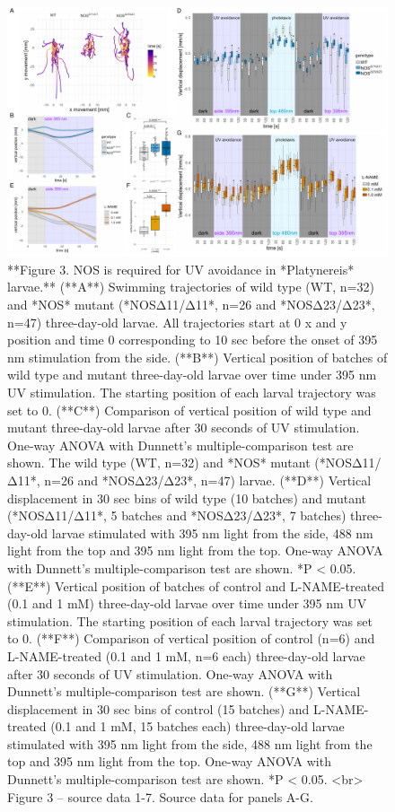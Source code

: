 \documentclass[
  10pt,
  onecolumn]{article}
\begin{document}
\begin{figure}
\includegraphics[width=44.44in]{figures/Fig3} \caption{**Figure 3. NOS is required for UV avoidance in *Platynereis* larvae.**  (**A**) Swimming trajectories of wild type (WT, n=32) and *NOS* mutant (*NOSΔ11/Δ11*, n=26 and *NOSΔ23/Δ23*, n=47) three-day-old larvae. All trajectories start at 0 x and y position and time 0 corresponding to 10 sec before the onset of 395 nm stimulation from the side. (**B**) Vertical position of batches of wild type and mutant three-day-old larvae over time under 395 nm UV stimulation. The starting position of each larval trajectory was set to 0. (**C**) Comparison of vertical position of wild type and mutant three-day-old larvae after 30 seconds of UV stimulation. One-way ANOVA with Dunnett’s multiple-comparison test are shown. The wild type (WT, n=32) and *NOS* mutant (*NOSΔ11/Δ11*, n=26 and *NOSΔ23/Δ23*, n=47) larvae. (**D**) Vertical displacement in 30 sec bins of wild type (10 batches) and mutant (*NOSΔ11/Δ11*, 5 batches and *NOSΔ23/Δ23*, 7 batches) three-day-old larvae stimulated with 395 nm light from the side, 488 nm light from the top and 395 nm light from the top. One-way ANOVA with Dunnett’s multiple-comparison test are shown. *P < 0.05. (**E**) Vertical position of batches of control and L-NAME-treated (0.1 and 1 mM) three-day-old larvae over time under 395 nm UV stimulation. The starting position of each larval trajectory was set to 0. (**F**) Comparison of vertical position of control (n=6) and L-NAME-treated (0.1 and 1 mM, n=6 each) three-day-old larvae after 30 seconds of UV stimulation. One-way ANOVA with Dunnett’s multiple-comparison test are shown. (**G**) Vertical displacement in 30 sec bins of control (15 batches) and L-NAME-treated (0.1 and 1 mM, 15 batches each) three-day-old larvae stimulated with 395 nm light from the side, 488 nm light from the top and 395 nm light from the top. One-way ANOVA with Dunnett’s multiple-comparison test are shown. *P < 0.05. <br> Figure 3 -- source data 1-7. Source data for panels A-G.}\label{fig:unnamed-chunk-3}
\end{figure}
\end{document}
